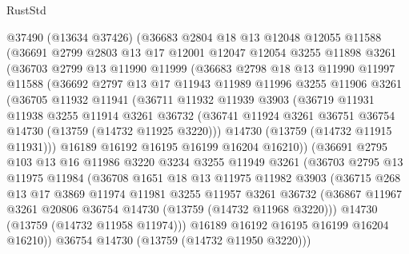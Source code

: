 \begin{lexlean}{RustStd}
\begin{coremodule}
    @37490
    (@13634 @37426)
    (@36683
      @2804
      @18
      @13
      @12048
      @12055
      @11588
      (@36691
        @2799
        @2803
        @13
        @17
        @12001
        @12047
        @12054
        @3255
        @11898
        @3261
        (@36703
          @2799
          @13
          @11990
          @11999
          (@36683
            @2798
            @18
            @13
            @11990
            @11997
            @11588
            (@36692
              @2797
              @13
              @17
              @11943
              @11989
              @11996
              @3255
              @11906
              @3261
              (@36705
                @11932
                @11941
                (@36711
                  @11932
                  @11939
                  @3903
                  (@36719
                    @11931
                    @11938
                    @3255
                    @11914
                    @3261
                    @36732
                    (@36741 @11924 @3261 @36751 @36754 @14730 (@13759 (@14732 @11925 @3220)))
                    @14730
                    (@13759 (@14732 @11915 @11931)))
                  @16189
                  @16192
                  @16195
                  @16199
                  @16204
                  @16210))
              (@36691
                @2795
                @103
                @13
                @16
                @11986
                @3220
                @3234
                @3255
                @11949
                @3261
                (@36703
                  @2795
                  @13
                  @11975
                  @11984
                  (@36708
                    @1651
                    @18
                    @13
                    @11975
                    @11982
                    @3903
                    (@36715
                      @268
                      @13
                      @17
                      @3869
                      @11974
                      @11981
                      @3255
                      @11957
                      @3261
                      @36732
                      (@36867 @11967 @3261 @20806 @36754 @14730 (@13759 (@14732 @11968 @3220)))
                      @14730
                      (@13759 (@14732 @11958 @11974)))
                    @16189
                    @16192
                    @16195
                    @16199
                    @16204
                    @16210))
                @36754
                @14730
                (@13759 (@14732 @11950 @3220)))

\end{coremodule}
\end{lexlean}
